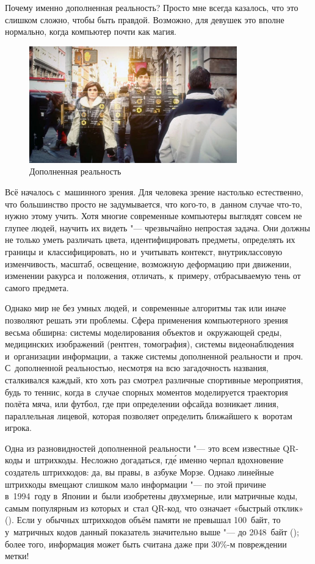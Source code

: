 \documentclass[final,pdftex]{../../template/epsilonj}
\begin{document}
Почему именно дополненная реальность? Просто мне всегда казалось, что это слишком сложно, чтобы быть правдой. Возможно, для девушек это вполне нормально, когда компьютер почти как магия.

\begin{figure}[htbp]
\centering 	\includegraphics[width=90mm]{1.jpg}
\caption{Дополненная реальность} 
\end{figure}

Всё началось с~машинного зрения. Для человека зрение настолько естественно, что большинство просто не задумывается, что кого-то, в~данном случае что-то, нужно этому учить. Хотя многие современные компьютеры выглядят совсем не глупее людей, научить их видеть "--- чрезвычайно непростая задача. Они должны не только уметь различать цвета, идентифицировать предметы, определять их границы и~классифицировать, но и~учитывать контекст, внутриклассовую изменчивость, масштаб, освещение, возможную деформацию при движении, изменении ракурса и~положения, отличать, к~примеру, отбрасываемую тень от самого предмета.

Однако мир не без умных людей, и~современные алгоритмы так или иначе позволяют решать эти проблемы. Сфера применения компьютерного зрения весьма обширна: системы моделирования объектов и~окружающей среды, медицинских изображений (рентген, томография), системы видеонаблюдения и~организации информации, а~также системы дополненной реальности и~проч. С~дополненной реальностью, несмотря на всю загадочность названия, сталкивался каждый, кто хоть раз смотрел различные спортивные мероприятия, будь то теннис, когда в~случае спорных моментов моделируется траектория полёта мяча, или футбол, где при определении офсайда возникает линия, параллельная лицевой, которая позволяет определить ближайшего к~воротам игрока.

Одна из разновидностей дополненной реальности "--- это всем известные QR-коды и~штрихкоды. Несложно догадаться, гд\'{е} именно черпал вдохновение создатель штрихкодов: да, вы правы, в~азбуке Морзе. Однако линейные штрихкоды вмещают слишком мало информации "--- по этой причине в~1994~году в~Японии и~были изобретены двухмерные, или матричные коды, самым популярным из которых и~стал QR-код, что означает «быстрый отклик» (). Если у~обычных штрихкодов объём памяти не превышал 100~байт, то у~матричных кодов данный показатель значительно выше "--- до 2048~байт (\cite{WikiDataMatrixRu}); более того, информация может быть считана даже при 30\%-м повреждении метки! 
\end{document}
